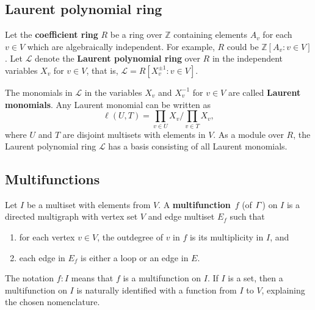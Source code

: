 \documentclass[11pt]{article}
\theoremstyle{definition}
\numberwithin{equation}{section}
\newcommand{\vocab}[1]{\textbf{#1}}
\newcommand{\integers}{\mathbb{Z}}
\newcommand{\vertices}{V}
\newcommand{\edges}{E}
\newcommand{\coefficientring}{R}
\newcommand{\laurentpolynomialring}{\mathcal{L}}
\newcommand{\laurentmonomial}[2]{\ell(#1, #2)}
\begin{document}
\subsection{Laurent polynomial ring} \label{subsection:laurentpolynomialring}

Let the \vocab{coefficient ring} \(\coefficientring\) be a ring over \(\integers\)
containing elements \(A_v\) for each \(v \in \vertices\) which are algebraically independent.
For example, \(\coefficientring\) could be
\(\integers[A_v : v \in \vertices]\).
Let \(\laurentpolynomialring\) denote the \vocab{Laurent polynomial ring} over \(\coefficientring\)
in the independent variables \(X_v\) for \(v \in \vertices\), that is,
\( \laurentpolynomialring = \coefficientring[X_v^{\pm 1} : v \in \vertices]\).

The monomials in \(\laurentpolynomialring\) in the variables \(X_v\) and \(X_v^{-1}\) for \(v \in \vertices\) are called \vocab{Laurent monomials}.
Any Laurent monomial can be written as
\begin{equation*}
    \laurentmonomial{U}{T} = \prod_{v \in U} X_v \bigg/ \prod_{v \in T} X_v,
\end{equation*}
where \(U\) and \(T\) are disjoint multisets with elements in \(\vertices\).
As a module over \(\coefficientring\), the Laurent polynomial ring \(\laurentpolynomialring\) has a basis consisting of all Laurent monomials.

\subsection{Multifunctions} \label{subsection:multifunctions}

Let \(I\) be a multiset with elements from \(\vertices\).
A \vocab{multifunction}~\(f\) (of \(\varGamma\)) on \(I\) is a directed multigraph with vertex set \(\vertices\) and edge multiset \(\edges_f\) such that
\begin{enumerate}[label = (F\arabic*), ref = (F\arabic*), leftmargin = .6in]
    \item for each vertex \(v \in \vertices\), the outdegree of \(v\) in \(f\) is its multiplicity in \(I\), and
    \item each edge in \(\edges_f\) is either a loop or an edge in \(\edges\).
\end{enumerate}
The notation \(f:I\) means that \(f\) is a multifunction on \(I\).
If \(I\) is a set, then a multifunction on \(I\) is naturally identified with a function from \(I\) to \(\vertices\), explaining the chosen nomenclature. 
\end{document}
